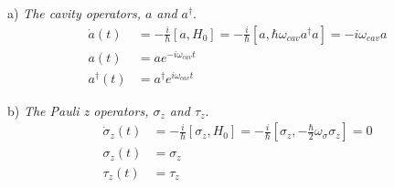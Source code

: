\documentclass[
    preprint,
    amsmath,amssymb,
    aps,
    prb,
    floatfix,
]{revtex4-2}
\begin{document}
    a) \emph{The cavity operators, $a$ and $a^\dagger$}.
    \begin{align*}
        \dot{a}(t) &= -\frac{i}{\hbar}\left[a,H_0\right] = -\frac{i}{\hbar}\left[a,\hbar\omega_{cav}a^\dagger a\right] = -i\omega_{cav}a \\
        a(t) &= ae^{-i\omega_{cav}t} \\
        a^\dagger(t) &= a^\dagger e^{i\omega_{cav}t}
    \end{align*}

    b) \emph{The Pauli z operators, $\sigma_z$ and $\tau_z$}.
    \begin{align*}
        \dot{\sigma}_z(t) &= -\frac{i}{\hbar}\left[\sigma_z,H_0\right] = -\frac{i}{\hbar}\left[\sigma_z,-\frac{\hbar}{2}\omega_\sigma\sigma_z\right] = 0 \\
              \sigma_z(t) &= \sigma_z \\
                \tau_z(t) &= \tau_z
    \end{align*}
\end{document}
